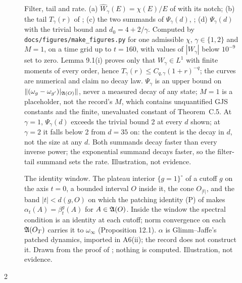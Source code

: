 \documentclass[11pt,a4paper]{article}
\begin{document}
\begin{figure}[htbp]
\centering

\caption{Filter, tail and rate. (a) $\widehat W_\gamma(E)=\chi(E)/E$ of
 with its notch; (b) the tail $T_\gamma(r)$ of
; (c) the two summands of $\Psi_\gamma(d)$,
; (d) $\Psi_\gamma(d)$ with the trivial bound and
$d_0=4+2/\gamma$. Computed by \texttt{docs/figures/make\_figures.py} for one admissible
$\chi$, $\gamma\in\{1,2\}$ and $M=1$, on a time grid up to $t=160$, with values of
$|W_\gamma|$ below $10^{-9}$ set to zero. Lemma 9.1(i) proves only that $W_\gamma\in L^1$
with finite moments of every order, hence $T_\gamma(r)\le C_{q,\gamma}(1+r)^{-q}$; the
curves are numerical and claim no decay law. $\Psi_\gamma$ is an upper bound on
$\|(\omega_g-\omega_{g'})|_{\mathfrak{A}(O)}\|$, never a measured decay of any state; $M=1$ is a
placeholder, not the record's $M$, which contains unquantified GJS constants and the
finite, unevaluated constant of Theorem~C.5. At
$\gamma=1$, $\Psi_\gamma(d)$ exceeds the trivial bound 2 at every $d$ shown; at
$\gamma=2$ it falls below 2 from $d=35$ on: the content is the decay in $d$, not the size
at any $d$. Both summands decay faster than every inverse power; the exponential summand
decays faster, so the filter-tail summand sets the rate. Illustration, not evidence.}
\label{fig:rate}
\end{figure}





\begin{figure}[t]
\centering

\caption{The identity window. The plateau interior $\{g=1\}^\circ$ of a cutoff $g$ on
the axis $t=0$, a bounded interval $O$ inside it, the cone $O_{|t|}$, and the band
$|t|<d(g,O)$ on which the patching identity (P) of  makes
$\alpha_t(A)=\beta^g_t(A)$ for $A\in\mathfrak{A}(O)$. Inside the window the spectral condition is
an identity at each cutoff; norm convergence on each $\mathfrak{A}(O_T)$ carries it to
$\omega_\infty$ (Proposition 12.1). $\alpha$ is Glimm--Jaffe's patched dynamics, imported
in A6(ii); the record does not construct it. Drawn from the proof of
; nothing is computed. Illustration, not evidence.}
\label{fig:window}
\end{figure}






{\let\small\footnotesize\setlength{\columnsep}{14pt}
\begin{multicols}{2}\raggedright

\end{multicols}}
\end{document}
